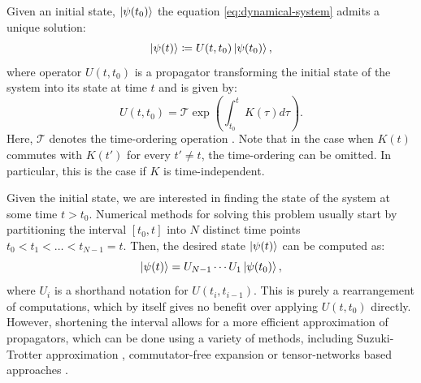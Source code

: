 Given an initial state, $\ket{\psi(t_0)}$ the equation
\eqref{eq:dynamical-system} admits a unique solution:
\begin{equation}
  \ket{\psi(t)} \coloneqq U(t, t_0) \ket{\psi(t_0)},
\end{equation}
where operator $U(t, t_0)$ is a propagator transforming the initial state of
the system into its state at time $t$ and is given by:
\begin{equation}
  \label{eq:propagator}
  U(t, t_0) = \mathcal{T} \exp \left( \int_{t_0}^t K(\tau)d\tau \right).
\end{equation}
Here, $\mathcal{T}$ denotes the time-ordering operation \cite{chronological}.
Note that in the case when $K(t)$ commutes with $K(t')$ for every $t' \ne t$,
the time-ordering can be omitted. In particular, this is the case if $K$ is
time-independent.

Given the initial state, we are interested in finding the state of the system
at some time $t > t_0$. Numerical methods for solving this problem usually
start by partitioning the interval $[t_0, t]$ into $N$ distinct time points
$t_0 < t_1 < \ldots < t_{N-1} = t$. Then, the desired state $\ket{\psi(t)}$ can
be computed as:
%
\begin{equation}
  \ket{\psi(t)} = U_{N-1} \cdots U_1 \ket{\psi(t_0)},
\end{equation}
%
where $U_i$ is a shorthand notation for $U(t_i, t_{i-1})$. This is purely a
rearrangement of computations, which by itself gives no benefit over applying
$U(t, t_0)$ directly. However, shortening the interval allows for a more
efficient approximation of propagators, which can be done using a variety of
methods, including Suzuki-Trotter approximation \cite{suzuki}, commutator-free
expansion \cite{commutatorfree} or tensor-networks based approaches
\cite{dmrg}.

